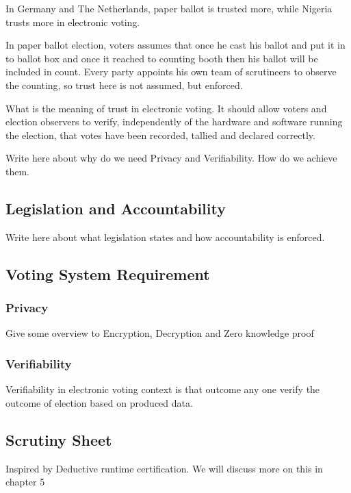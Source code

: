    	
    
    In Germany and The Netherlands, paper ballot is trusted more, 
    while Nigeria trusts more in electronic voting. 
    
	In paper ballot election, voters assumes that once he cast his
	ballot and put it in to ballot box and once it reached to counting 
	booth then his ballot will be included in count. 
	Every party appoints his own team of scrutineers to observe 
	the counting, so trust here is not assumed, but enforced. 
		
	  
      What is the meaning of trust in electronic voting. 
       It should allow voters and election observers to verify, 
       independently of the hardware and software running the 
       election, that votes have been recorded, tallied and 
       declared correctly.
       
       Write here about why do we need Privacy and Verifiability.
       How do we achieve them.
   \subsection{Legislation and Accountability}
    Write here about what legislation states and how accountability 
    is enforced. 
   	 
   \subsection{Voting System Requirement}
   	\subsubsection{Privacy}
         Give some overview to Encryption, Decryption and 
         Zero knowledge proof
       
   	\subsubsection{Verifiability}
       Verifiability in electronic voting context is that outcome 
       any one verify the outcome of election based on produced data. 
       
	       
    
   \subsection{Scrutiny Sheet}
       Inspired by Deductive runtime certification. 
    We will discuss more on this in chapter 5
   

